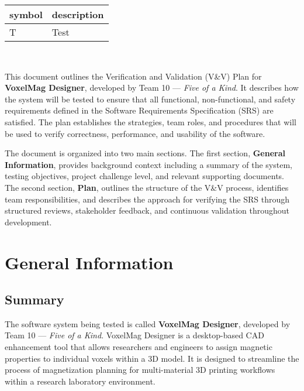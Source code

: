\documentclass[12pt, titlepage]{article}
\begin{document}
\renewcommand{\arraystretch}{1.2}
\begin{tabular}{l l} 
  \toprule		
  \textbf{symbol} & \textbf{description}\\
  \midrule 
  T & Test\\
  \bottomrule
\end{tabular}\\



\newpage


This document outlines the Verification and Validation (V\&V) Plan for \textbf{VoxelMag Designer}, developed by Team 10 --- \textit{Five of a Kind}. It describes how the system will be tested to ensure that all functional, non-functional, and safety requirements defined in the Software Requirements Specification (SRS) are satisfied. The plan establishes the strategies, team roles, and procedures that will be used to verify correctness, performance, and usability of the software.

The document is organized into two main sections. The first section, \textbf{General Information}, provides background context including a summary of the system, testing objectives, project challenge level, and relevant supporting documents. The second section, \textbf{Plan}, outlines the structure of the V\&V process, identifies team responsibilities, and describes the approach for verifying the SRS through structured reviews, stakeholder feedback, and continuous validation throughout development.

\section{General Information}

\subsection{Summary}

The software system being tested is called \textbf{VoxelMag Designer}, developed by Team 10 --- \textit{Five of a Kind}. VoxelMag Designer is a desktop-based CAD enhancement tool that allows researchers and engineers to assign magnetic properties to individual voxels within a 3D model. It is designed to streamline the process of magnetization planning for multi-material 3D printing workflows within a research laboratory environment.
\end{document}
